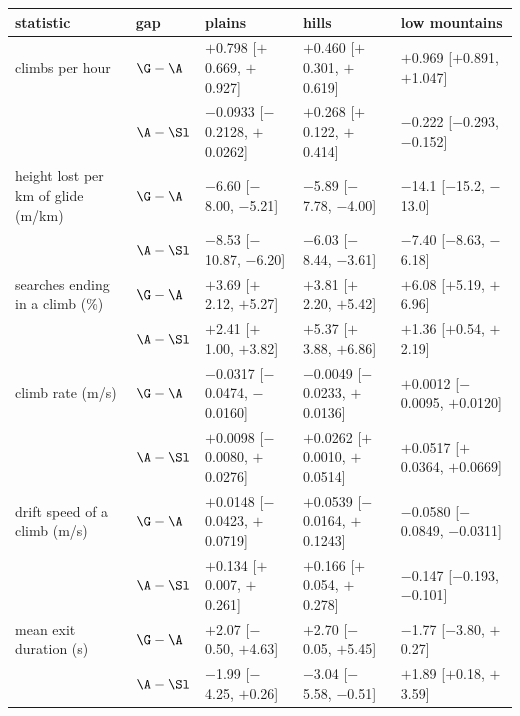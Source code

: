 \begin{tabular}{@{}l l l l l @{}}
\toprule
 statistic & gap & plains & hills & low mountains \\
\midrule
climbs per hour & $\G-\A$ & $+$0.798 [$+$0.669, $+$0.927] & $+$0.460 [$+$0.301, $+$0.619] & $+$0.969 [$+$0.891, $+$1.047] \\
 & $\A-\Sl$ & $-$0.0933 [$-$0.2128, $+$0.0262] & $+$0.268 [$+$0.122, $+$0.414] & $-$0.222 [$-$0.293, $-$0.152] \\
\addlinespace
height lost per km of glide (m/km) & $\G-\A$ & $-$6.60 [$-$8.00, $-$5.21] & $-$5.89 [$-$7.78, $-$4.00] & $-$14.1 [$-$15.2, $-$13.0] \\
 & $\A-\Sl$ & $-$8.53 [$-$10.87, $-$6.20] & $-$6.03 [$-$8.44, $-$3.61] & $-$7.40 [$-$8.63, $-$6.18] \\
\addlinespace
searches ending in a climb (\%) & $\G-\A$ & $+$3.69 [$+$2.12, $+$5.27] & $+$3.81 [$+$2.20, $+$5.42] & $+$6.08 [$+$5.19, $+$6.96] \\
 & $\A-\Sl$ & $+$2.41 [$+$1.00, $+$3.82] & $+$5.37 [$+$3.88, $+$6.86] & $+$1.36 [$+$0.54, $+$2.19] \\
\addlinespace
climb rate (m/s) & $\G-\A$ & $-$0.0317 [$-$0.0474, $-$0.0160] & $-$0.0049 [$-$0.0233, $+$0.0136] & $+$0.0012 [$-$0.0095, $+$0.0120] \\
 & $\A-\Sl$ & $+$0.0098 [$-$0.0080, $+$0.0276] & $+$0.0262 [$+$0.0010, $+$0.0514] & $+$0.0517 [$+$0.0364, $+$0.0669] \\
\addlinespace
drift speed of a climb (m/s) & $\G-\A$ & $+$0.0148 [$-$0.0423, $+$0.0719] & $+$0.0539 [$-$0.0164, $+$0.1243] & $-$0.0580 [$-$0.0849, $-$0.0311] \\
 & $\A-\Sl$ & $+$0.134 [$+$0.007, $+$0.261] & $+$0.166 [$+$0.054, $+$0.278] & $-$0.147 [$-$0.193, $-$0.101] \\
\addlinespace
mean exit duration (s) & $\G-\A$ & $+$2.07 [$-$0.50, $+$4.63] & $+$2.70 [$-$0.05, $+$5.45] & $-$1.77 [$-$3.80, $+$0.27] \\
 & $\A-\Sl$ & $-$1.99 [$-$4.25, $+$0.26] & $-$3.04 [$-$5.58, $-$0.51] & $+$1.89 [$+$0.18, $+$3.59] \\
\bottomrule
\end{tabular}
